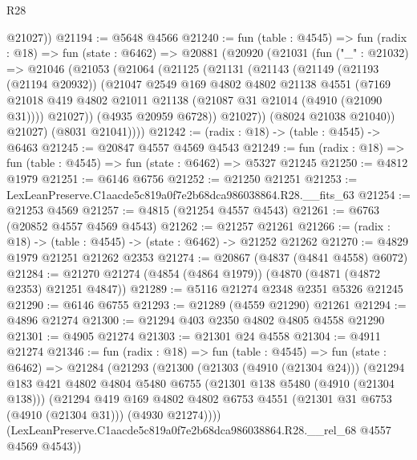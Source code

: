 \begin{lexlean}{R28}
\begin{coremodule}
        @21027))
@21194 := @5648 @4566
@21240 := fun (table : @4545) =>
  fun (radix : @18) =>
  fun (state : @6462) =>
  @20881
    (@20920
      (@21031
        (fun ("_" : @21032) =>
        @21046
          (@21053
            (@21064
              (@21125
                (@21131
                  (@21143
                    (@21149
                      (@21193 (@21194 @20932))
                      (@21047
                        @2549
                        @169
                        @4802
                        @4802
                        @21138
                        @4551
                        (@7169
                          @21018
                          @419
                          @4802
                          @21011
                          @21138
                          (@21087 @31 @21014 (@4910 (@21090 @31))))
                        @21027))
                    (@4935 @20959 @6728))
                  @21027))
              (@8024 @21038 @21040))
            @21027)
          (@8031 @21041))))
@21242 := (radix : @18) -> (table : @4545) -> @6463
@21245 := @20847 @4557 @4569 @4543
@21249 := fun (radix : @18) => fun (table : @4545) => fun (state : @6462) => @5327 @21245
@21250 := @4812 @1979
@21251 := @6146 @6756
@21252 := @21250 @21251
@21253 := LexLeanPreserve.C1aacde5c819a0f7e2b68dca986038864.R28.__fits_63
@21254 := @21253 @4569
@21257 := @4815 (@21254 @4557 @4543)
@21261 := @6763 (@20852 @4557 @4569 @4543)
@21262 := @21257 @21261
@21266 := (radix : @18) -> (table : @4545) -> (state : @6462) -> @21252 @21262
@21270 := @4829 @1979 @21251 @21262 @2353
@21274 := @20867 (@4837 (@4841 @4558) @6072)
@21284 := @21270 @21274 (@4854 (@4864 @1979)) (@4870 (@4871 (@4872 @2353) @21251 @4847))
@21289 := @5116 @21274 @2348 @2351 @5326 @21245
@21290 := @6146 @6755
@21293 := @21289 (@4559 @21290) @21261
@21294 := @4896 @21274
@21300 := @21294 @403 @2350 @4802 @4805 @4558 @21290
@21301 := @4905 @21274
@21303 := @21301 @24 @4558
@21304 := @4911 @21274
@21346 := fun (radix : @18) =>
  fun (table : @4545) =>
  fun (state : @6462) =>
  @21284
    (@21293
      (@21300
        (@21303 (@4910 (@21304 @24)))
        (@21294
          @183
          @421
          @4802
          @4804
          @5480
          @6755
          (@21301 @138 @5480 (@4910 (@21304 @138)))
          (@21294
            @419
            @169
            @4802
            @4802
            @6753
            @4551
            (@21301 @31 @6753 (@4910 (@21304 @31)))
            (@4930 @21274))))
      (LexLeanPreserve.C1aacde5c819a0f7e2b68dca986038864.R28.__rel_68 @4557 @4569 @4543))

\end{coremodule}
\end{lexlean}
